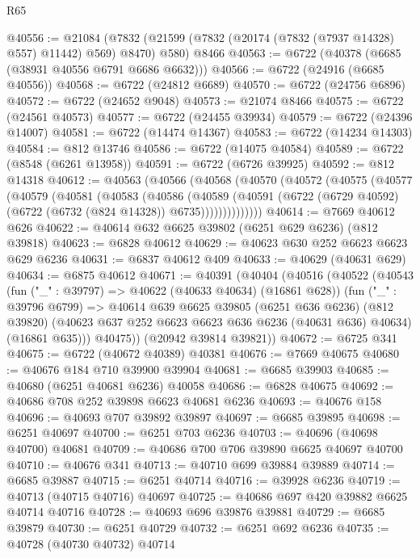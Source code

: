 \begin{lexlean}{R65}
\begin{coremodule}
{@40556 := @21084
    (@7832 (@21599 (@7832 (@20174 (@7832 (@7937 @14328) @557) @11442) @569) @8470) @580)
    @8466
@40563 := @6722 (@40378 (@6685 (@38931 @40556 @6791 @6686 @6632)))
@40566 := @6722 (@24916 (@6685 @40556))
@40568 := @6722 (@24812 @6689)
@40570 := @6722 (@24756 @6896)
@40572 := @6722 (@24652 @9048)
@40573 := @21074 @8466
@40575 := @6722 (@24561 @40573)
@40577 := @6722 (@24455 @39934)
@40579 := @6722 (@24396 @14007)
@40581 := @6722 (@14474 @14367)
@40583 := @6722 (@14234 @14303)
@40584 := @812 @13746
@40586 := @6722 (@14075 @40584)
@40589 := @6722 (@8548 (@6261 @13958))
@40591 := @6722 (@6726 @39925)
@40592 := @812 @14318
@40612 := @40563
    (@40566
      (@40568
        (@40570
          (@40572
            (@40575
              (@40577
                (@40579
                  (@40581
                    (@40583
                      (@40586
                        (@40589
                          (@40591
                            (@6722 (@6729 @40592) (@6722 (@6732 (@824 @14328)) @6735))))))))))))))
@40614 := @7669 @40612 @626
@40622 := @40614 @632 @6625 @39802 (@6251 @629 @6236) (@812 @39818)
@40623 := @6828 @40612
@40629 := @40623 @630 @252 @6623 @6623 @629 @6236
@40631 := @6837 @40612 @409
@40633 := @40629 (@40631 @629)
@40634 := @6875 @40612
@40671 := @40391
    (@40404
      (@40516
        (@40522
          (@40543
            (fun ("_" : @39797) => @40622 (@40633 @40634) (@16861 @628))
            (fun ("_" : @39796 @6799) =>
            @40614
              @639
              @6625
              @39805
              (@6251 @636 @6236)
              (@812 @39820)
              (@40623 @637 @252 @6623 @6623 @636 @6236 (@40631 @636) @40634)
              (@16861 @635)))
          @40475))
      (@20942 @39814 @39821))
@40672 := @6725 @341
@40675 := @6722 (@40672 @40389) @40381
@40676 := @7669 @40675
@40680 := @40676 @184 @710 @39900 @39904
@40681 := @6685 @39903
@40685 := @40680 (@6251 @40681 @6236) @40058
@40686 := @6828 @40675
@40692 := @40686 @708 @252 @39898 @6623 @40681 @6236
@40693 := @40676 @158
@40696 := @40693 @707 @39892 @39897
@40697 := @6685 @39895
@40698 := @6251 @40697
@40700 := @6251 @703 @6236
@40703 := @40696 (@40698 @40700) @40681
@40709 := @40686 @700 @706 @39890 @6625 @40697 @40700
@40710 := @40676 @341
@40713 := @40710 @699 @39884 @39889
@40714 := @6685 @39887
@40715 := @6251 @40714
@40716 := @39928 @6236
@40719 := @40713 (@40715 @40716) @40697
@40725 := @40686 @697 @420 @39882 @6625 @40714 @40716
@40728 := @40693 @696 @39876 @39881
@40729 := @6685 @39879
@40730 := @6251 @40729
@40732 := @6251 @692 @6236
@40735 := @40728 (@40730 @40732) @40714
}
\end{coremodule}
\end{lexlean}
